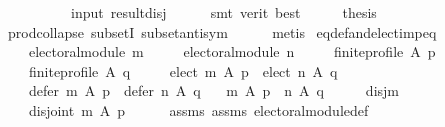 \begin{isabellebody}
\ \ \ \ \ \ \ \ \ \ input\ result{\isacharunderscore}{\kern0pt}disj\isanewline
\ \ \ \ \isamarkupfalse%
\ {\isacharparenleft}{\kern0pt}smt\ {\isacharparenleft}{\kern0pt}verit{\isacharcomma}{\kern0pt}\ best{\isacharparenright}{\kern0pt}{\isacharparenright}{\kern0pt}\isanewline
\ \ \isamarkupfalse%
\ \isamarkupfalse%
\ {\isacharquery}{\kern0pt}thesis\isanewline
\ \ \ \ \isamarkupfalse%
\ prod{\isachardot}{\kern0pt}collapse\ subsetI\ subset{\isacharunderscore}{\kern0pt}antisym\isanewline
\ \ \ \ \isamarkupfalse%
\ metis\isanewline
{}\isamarkupfalse%
%
\endisatagproof
{\isafoldproof}%
%
\isadelimproof
\isanewline
%
\endisadelimproof
\isanewline
{}\isamarkupfalse%
\ eq{\isacharunderscore}{\kern0pt}def{\isacharunderscore}{\kern0pt}and{\isacharunderscore}{\kern0pt}elect{\isacharunderscore}{\kern0pt}imp{\isacharunderscore}{\kern0pt}eq{\isacharcolon}{\kern0pt}\isanewline
\ \ \isanewline
\ \ \ \ {\isachardoublequoteopen}electoral{\isacharunderscore}{\kern0pt}module\ m{\isachardoublequoteclose}\ \isanewline
\ \ \ \ {\isachardoublequoteopen}electoral{\isacharunderscore}{\kern0pt}module\ n{\isachardoublequoteclose}\ \isanewline
\ \ \ \ {\isachardoublequoteopen}finite{\isacharunderscore}{\kern0pt}profile\ A\ p{\isachardoublequoteclose}\ \isanewline
\ \ \ \ {\isachardoublequoteopen}finite{\isacharunderscore}{\kern0pt}profile\ A\ q{\isachardoublequoteclose}\ \isanewline
\ \ \ \ {\isachardoublequoteopen}elect\ m\ A\ p\ {\isacharequal}{\kern0pt}\ elect\ n\ A\ q{\isachardoublequoteclose}\ \isanewline
\ \ \ \ {\isachardoublequoteopen}defer\ m\ A\ p\ {\isacharequal}{\kern0pt}\ defer\ n\ A\ q{\isachardoublequoteclose}\isanewline
\ \ \ {\isachardoublequoteopen}m\ A\ p\ {\isacharequal}{\kern0pt}\ n\ A\ q{\isachardoublequoteclose}\isanewline
%
\isadelimproof
%
\endisadelimproof
%
\isatagproof
{}\isamarkupfalse%
\ {\isacharminus}{\kern0pt}\isanewline
\ \ \isamarkupfalse%
\ disj{\isacharunderscore}{\kern0pt}m{\isacharcolon}{\kern0pt}\isanewline
\ \ \ \ {\isachardoublequoteopen}disjoint{}\ {\isacharparenleft}{\kern0pt}m\ A\ p{\isacharparenright}{\kern0pt}{\isachardoublequoteclose}\isanewline
\ \ \ \ \isamarkupfalse%
\ assms{\isacharparenleft}{\kern0pt}{}{\isacharparenright}{\kern0pt}\ assms{\isacharparenleft}{\kern0pt}{}{\isacharparenright}{\kern0pt}\ electoral{\isacharunderscore}{\kern0pt}module{\isacharunderscore}{\kern0pt}def\isanewline

\end{isabellebody}
